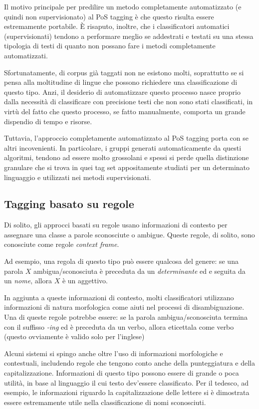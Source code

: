 Il motivo principale per predilire un metodo completamente automatizzato (e quindi non supervisionato) al PoS tagging \`e che questo risulta essere estremamente portabile.
\`E risaputo, inoltre, che i classificatori automatici (supervisionati) tendono a performare meglio se addestrati e testati su una stessa tipologia di testi di quanto non possano fare i metodi completamente automatizzati.

Sfortunatamente, di corpus gi\`a taggati non ne esistono molti, soprattutto se si pensa alla moltitudine di lingue che possono richiedere una classificazione di questo tipo.
Anzi, il desiderio di automatizzare questo processo nasce proprio dalla necessit\`a di classificare con precisione testi che non sono stati classificati, in virt\`u del fatto che questo processo, se fatto manualmente, comporta un grande dispendio di tempo e risorse.

Tuttavia, l'approccio completamente automatizzato al PoS tagging porta con se altri incovenienti.
In particolare, i gruppi generati automaticamente da questi algoritmi, tendono ad essere molto grossolani e spessi si perde quella distinzione granulare che si trova in quei tag set appositamente studiati per un determinato linguaggio e utilizzati nei metodi supervisionati.

\subsection{Tagging basato su regole}
\nocite{Brill:1992}
\nocite{Greene:1971}

Di solito, gli approcci basati su regole usano informazioni di contesto per assegnare una classe a parole sconosciute o ambigue.
Queste regole, di solito, sono conosciute come regole \emph{context frame}.

Ad esempio, una regola di questo tipo pu\`o essere qualcosa del genere: se una parola $X$ ambigua/sconosciuta \`e preceduta da un \emph{determinante} ed e seguita da un \emph{nome}, allora $X$ \`e un aggettivo.

In aggiunta a queste informazioni di contesto, molti classificatori utilizzano informazioni di natura morfologica come aiuti nel processi di disambiguazione.
Una di queste regole potrebbe essere: se la parola ambigua/sconosciuta termina con il suffisso \emph{-ing} ed \`e preceduta da un verbo, allora eticettala come verbo (questo ovviamente \`e valido solo per l'inglese)

Alcuni sistemi si spingo anche oltre l'uso di informazioni morfologiche e contestuali, includendo regole che tengono conto anche della punteggiatura e della capitalizzazione.
Informazioni di questo tipo possono essere di grande o poca utilit\`a, in base al linguaggio il cui testo dev'essere classificato.
Per il tedesco, ad esempio, le informazioni riguardo la capitalizzazione delle lettere si \`e dimostrata essere estremamente utile nella classificazione di nomi sconosciuti.

